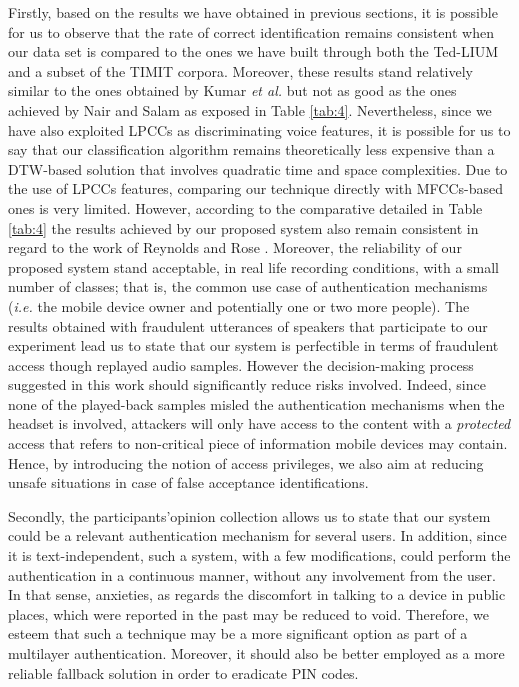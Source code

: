 \documentclass[cryptography,article,submit,moreauthors,pdftex,10pt,a4paper]{mdpi}
\begin{document}
Firstly, based on the results we have obtained in previous sections, it is possible for us to observe that the rate of correct identification remains consistent when our data set is compared to the ones we have built through both the Ted-LIUM and a subset of the TIMIT corpora. Moreover, these results stand relatively similar to the ones obtained by Kumar \textit{et al.} \cite{18} but not as good as the ones achieved by Nair and Salam \cite{19} as exposed in Table \ref{tab:4}. Nevertheless, since we  have also exploited LPCCs as discriminating voice features, it is possible for us to say that our classification algorithm remains theoretically less expensive than a DTW-based solution that involves quadratic time and space complexities. Due to the use of LPCCs features, comparing our technique directly with MFCCs-based ones is very limited. However, according to the comparative detailed in Table \ref{tab:4} the results achieved by our proposed system also remain consistent in regard to the work of Reynolds and Rose \cite{20}. Moreover, the reliability of our proposed system stand acceptable, in real life recording conditions, with a small number of classes; that is, the common use case of authentication mechanisms (\textit{i.e.} the mobile device owner and potentially one or two more people). The results obtained with fraudulent utterances of speakers that participate to our experiment lead us to state that our system is perfectible in terms of fraudulent access though replayed audio samples. However the decision-making process suggested in this work should significantly reduce risks involved. Indeed, since none of the played-back samples misled the authentication mechanisms when the headset is involved, attackers will only have access to the content with a \textit{protected} access that refers to non-critical piece of information mobile devices may contain. Hence, by introducing the notion of access privileges, we also aim at reducing unsafe situations in case of false acceptance identifications.

Secondly, the participants\textquoteright opinion collection allows us to state that our system could be a relevant authentication mechanism for several users. In addition, since it is text-independent, such a system, with a few modifications, could perform the authentication in a continuous manner, without any involvement from the user. In that sense, anxieties, as regards the discomfort in talking to a device in public places, which were reported in the past may be reduced to void. Therefore, we esteem that such a technique may be a more significant option as part of a multilayer authentication. Moreover, it should also be better employed as a more reliable fallback solution in order to eradicate PIN codes.
\end{document}
